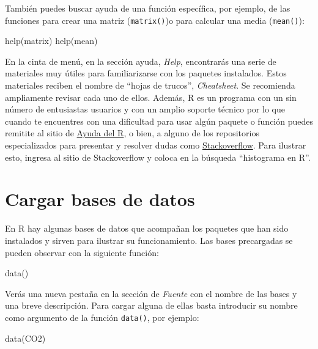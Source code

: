 \documentclass[
  11pt,
  oneside]{book}
\newenvironment{Shaded}{\begin{snugshade}}{\end{snugshade}}
\newcommand{\FunctionTok}[1]{\textcolor[rgb]{0.00,0.00,0.00}{#1}}
\newcommand{\NormalTok}[1]{#1}
\begin{document}
También puedes buscar ayuda de una función específica, por ejemplo, de las funciones para crear una matriz (\texttt{matrix()})o para calcular una media (\texttt{mean()}):

\begin{Shaded}
\begin{Highlighting}[]
\FunctionTok{help}\NormalTok{(matrix)}
\FunctionTok{help}\NormalTok{(mean)}
\end{Highlighting}
\end{Shaded}

En la cinta de menú, en la sección ayuda, \emph{Help}, encontrarás una serie de materiales muy útiles para familiarizarse con los paquetes instalados. Estos materiales reciben el nombre de ``hojas de trucos'', \emph{Cheatsheet}. Se recomienda ampliamente revisar cada uno de ellos. Además, R es un programa con un sin número de entusiastas usuarios y con un amplio soporte técnico por lo que cuando te encuentres con una dificultad para usar algún paquete o función puedes remitite al sitio de \href{https://www.r-project.org/help.html}{Ayuda del R}, o bien, a alguno de los repositorios especializados para presentar y resolver dudas como \href{https://es.stackoverflow.com/}{Stackoverflow}. Para ilustrar esto, ingresa al sitio de Stackoverflow y coloca en la búsqueda ``histograma en R''.

\hypertarget{cargar-bases-de-datos}{%
\section{Cargar bases de datos}\label{cargar-bases-de-datos}}

En R hay algunas bases de datos que acompañan los paquetes que han sido instalados y sirven para ilustrar su funcionamiento. Las bases precargadas se pueden observar con la siguiente función:

\begin{Shaded}
\begin{Highlighting}[]
\FunctionTok{data}\NormalTok{()}
\end{Highlighting}
\end{Shaded}

Verás una nueva pestaña en la sección de \emph{Fuente} con el nombre de las bases y una breve descripción. Para cargar alguna de ellas basta introducir su nombre como argumento de la función \texttt{data()}, por ejemplo:

\begin{Shaded}
\begin{Highlighting}[]
\FunctionTok{data}\NormalTok{(CO2)}
\end{Highlighting}
\end{Shaded}
\end{document}
